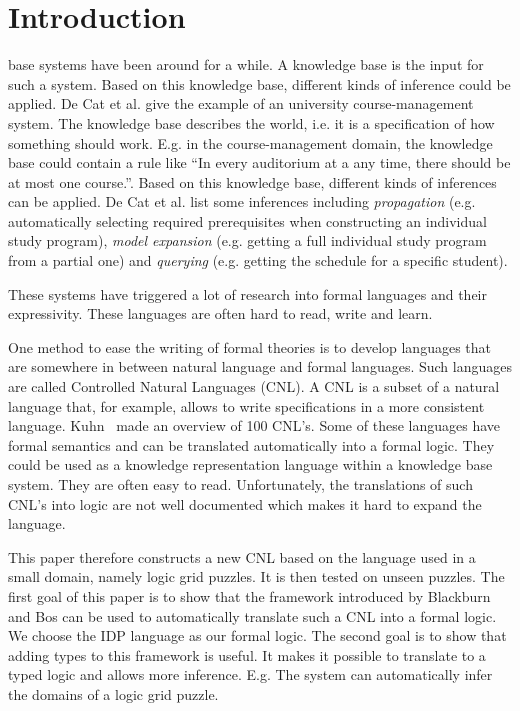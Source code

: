 \section{Introduction}

 base systems have been around for a while. A knowledge base is the input for such a system. Based on this knowledge base, different kinds of inference could be applied. De Cat et al. \cite{IDP} give the example of an university course-management system. The knowledge base describes the world, i.e. it is a specification of how something should work. E.g. in the course-management domain, the knowledge base could contain a rule like ``In every auditorium at a any time, there should be at most one course.''. Based on this knowledge base, different kinds of inferences can be applied. De Cat et al. list some inferences including \textit{propagation} (e.g. automatically selecting required prerequisites when constructing an individual study program), \textit{model expansion} (e.g. getting a full individual study program from a partial one) and \textit{querying} (e.g. getting the schedule for a specific student).

These systems have triggered a lot of research into formal languages and their expressivity. These languages are often hard to read, write and learn.

One method to ease the writing of formal theories is to develop languages that are somewhere in between natural language and formal languages. Such languages are called Controlled Natural Languages (CNL). A CNL is a subset of a natural language that, for example, allows to write specifications in a more consistent language. Kuhn~\cite{Kuhn2014} made an overview of 100 CNL's. Some of these languages have formal semantics and can be translated automatically into a formal logic. They could be used as a knowledge representation language within a knowledge base system. They are often easy to read. Unfortunately, the translations of such CNL's into logic are not well documented which makes it hard to expand the language.

This paper therefore constructs a new CNL based on the language used in a small domain, namely logic grid puzzles. It is then tested on unseen puzzles. The first goal of this paper is to show that the framework introduced by Blackburn and Bos \cite{Blackburn2005, Blackburn2006} can be used to automatically translate such a CNL into a formal logic. We choose the IDP language \cite{IDP} as our formal logic. The second goal is to show that adding types to this framework is useful. It makes it possible to translate to a typed logic and allows more inference. E.g. The system can automatically infer the domains of a logic grid puzzle.

